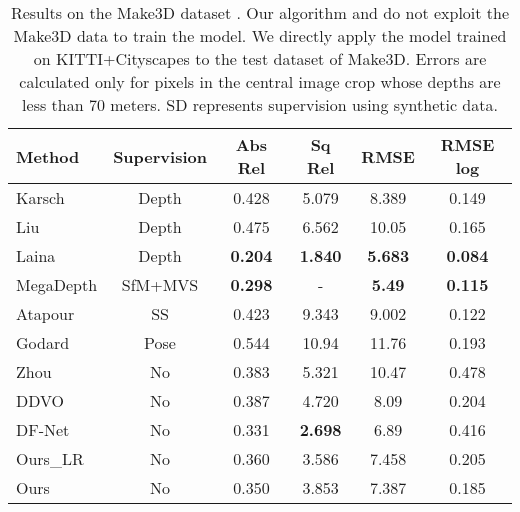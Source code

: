 \documentclass[10pt,twocolumn,letterpaper]{article}
\begin{document}
\begin{table}
	\small
	\begin{center}
		\begin{tabular}{@{} l @{}|@{} c @{}|@{}c|@{}c|@{}c|@{} c @{}}
			\hline
			Method    & Supervision & Abs Rel & Sq Rel & RMSE & RMSE log \\
			\hline\hline
			Karsch \etal \cite{karsch2014depth} & Depth & 0.428 & 5.079 & 8.389 & 0.149 \\
			Liu \etal \cite{liu2014discrete} & Depth & 0.475 & 6.562 & 10.05 & 0.165 \\
			Laina \etal \cite{laina2016deeper} & Depth & \textbf{0.204} & \textbf{1.840} &\textbf{5.683} & \textbf{0.084} \\
			\hline
			MegaDepth \cite{li2018megadepth} & SfM+MVS & \textbf{0.298} & - & \textbf{5.49} & \textbf{0.115} \\
			Atapour \etal \cite{atapour2018real} &SS& 0.423 & 9.343 & 9.002 & 0.122 \\
			Godard \etal \cite{godard2017unsupervised} & Pose & 0.544 & 10.94 & 11.76 & 0.193 \\			
			Zhou \etal \cite{zhou2017unsupervised} & No & 0.383 & 5.321 & 10.47 & 0.478 \\
			DDVO \cite{wang2018learning} & No & 0.387 & 4.720 & 8.09 & 0.204 \\
			DF-Net \cite{zou2018df} & No & 0.331 &\textbf{ 2.698} & 6.89 & 0.416 \\
			Ours\_LR     & No & 0.360 & 3.586 & 7.458 & 0.205 \\
			Ours & No & 0.350 & 3.853 & 7.387 & 0.185 \\ 
			\hline
		\end{tabular}
	\end{center}
	\caption{Results on the Make3D dataset \cite{saxena2009make3d}. Our algorithm and \cite{li2018megadepth,atapour2018real,godard2017unsupervised,zhou2017unsupervised,engel2018direct,zou2018df} do not exploit the Make3D data to train the model. We directly apply the model trained on KITTI+Cityscapes to the test dataset of Make3D. Errors are calculated only for pixels in the central image crop whose depths are less than 70 meters. SD represents supervision using synthetic data.} \label{table:make3d}
\end{table}
\end{document}
